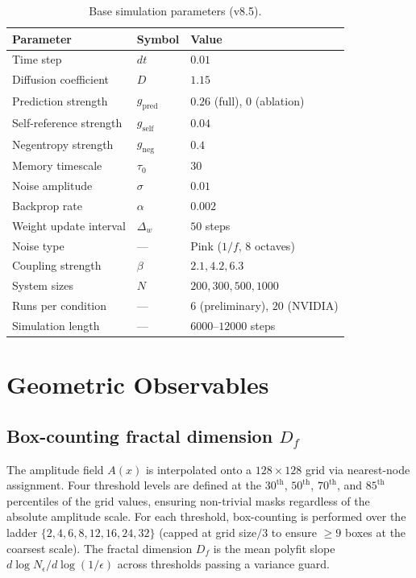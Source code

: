 \documentclass[12pt,a4paper]{article}
\theoremstyle{plain}
\theoremstyle{definition}
\begin{document}
\begin{table}[H]
\centering
\caption{Base simulation parameters (v8.5).}
\label{tab:params}
\begin{tabular}{lll}
\toprule
Parameter & Symbol & Value \\
\midrule
Time step              & $dt$              & $0.01$ \\
Diffusion coefficient  & $D$               & $1.15$ \\
Prediction strength    & $g_{\text{pred}}$ & $0.26$ (full), $0$ (ablation) \\
Self-reference strength& $g_{\text{self}}$ & $0.04$ \\
Negentropy strength    & $g_{\text{neg}}$  & $0.4$ \\
Memory timescale       & $\tau_0$          & $30$ \\
Noise amplitude        & $\sigma$          & $0.01$ \\
Backprop rate          & $\alpha$          & $0.002$ \\
Weight update interval & $\Delta_w$        & $50$ steps \\
Noise type             & ---               & Pink ($1/f$, 8 octaves) \\
Coupling strength      & $\beta$           & $2.1, 4.2, 6.3$ \\
System sizes           & $N$               & $200, 300, 500, 1000$ \\
Runs per condition     & ---               & $6$ (preliminary), $20$ (NVIDIA) \\
Simulation length      & ---               & $6000$--$12000$ steps \\
\bottomrule
\end{tabular}
\end{table}

\section{Geometric Observables}
\label{sec:metrics}

\subsection{Box-counting fractal dimension \texorpdfstring{$D_f$}{Df}}

The amplitude field $A(x)$ is interpolated onto a $128 \times 128$ grid
via nearest-node assignment. Four threshold levels are defined at the
$30^{\text{th}}$, $50^{\text{th}}$, $70^{\text{th}}$, and $85^{\text{th}}$
percentiles of the grid values, ensuring non-trivial masks regardless of
the absolute amplitude scale. For each threshold, box-counting is performed
over the ladder $\{2, 4, 6, 8, 12, 16, 24, 32\}$ (capped at grid
size$/3$ to ensure $\geq 9$ boxes at the coarsest scale). The fractal
dimension $D_f$ is the mean polyfit slope $d\log N_\epsilon /
d\log(1/\epsilon)$ across thresholds passing a variance guard.
\end{document}
